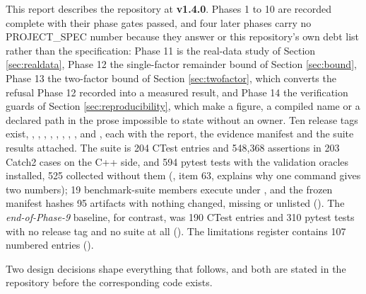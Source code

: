 \documentclass[11pt,a4paper]{article}
\begin{document}
This report describes the repository at \textbf{v1.4.0}. Phases 1 to 10 are recorded complete
with their phase gates passed, and four later phases carry no PROJECT\_SPEC number because they
answer  or this repository's own debt list rather than the
specification: Phase 11 is the real-data study
of Section \ref{sec:realdata}, Phase 12 the single-factor remainder bound of Section
\ref{sec:bound}, Phase 13 the two-factor bound of Section \ref{sec:twofactor}, which converts
the refusal Phase 12 recorded into a measured result, and Phase 14 the verification guards of Section
\ref{sec:reproducibility}, which make a figure, a compiled name or a declared path in the prose impossible
to state without an owner. Ten release tags exist, ,
, , , , , ,
,  and , each with the report, the evidence manifest and the suite results attached. The suite is 204 CTest entries and
548{,}368 assertions in 203 Catch2 cases on the C++ side, and 594 pytest tests with the validation
oracles installed, 525 collected without them (, item 63, explains why one
command gives two numbers); 19 benchmark-suite members execute under
, and the frozen manifest hashes 95 artifacts with nothing changed, missing or
unlisted (). The \emph{end-of-Phase-9} baseline, for contrast, was 190
CTest entries and 310 pytest tests with no release tag and no suite at all
(). The limitations
register contains 107 numbered entries ().

Two design decisions shape everything that follows, and both are stated in the repository
before the corresponding code exists.
\end{document}
